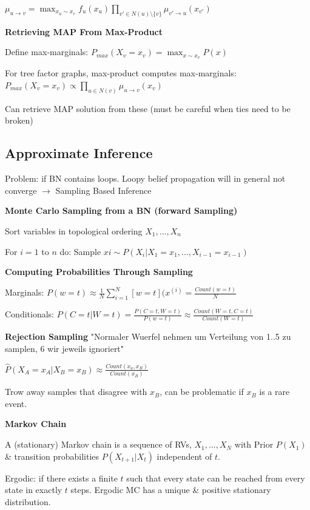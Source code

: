 \documentclass[a4paper, 11pt]{scrartcl}
\begin{document}
\begin{multicols*}{3}
$\mu_{u \rightarrow v} = \max_{x_u \sim x_v} f_u(x_u) \prod_{v' \in N(u) \setminus \{v\}} \mu_{v' \rightarrow u}(x_{v'})$ 
 
 \textbf{Retrieving MAP From Max-Product}
 \begin{compactitem}
 \item Define max-marginals: $P_{max}(X_v =x_v) = \max_{x \sim x_v} P(x)$
 \item For tree factor graphs, max-product computes max-marginals: 
 $P_{max}(X_v = x_v) \propto \prod_{u \in N(v)} \mu_{u \rightarrow v} (x_v)$ 
\item Can retrieve MAP solution from these (must be careful when ties need to be broken)
\end{compactitem}
\subsection{Approximate Inference}
Problem: if BN contains loops.
Loopy belief propagation will in general not converge	$\rightarrow$ Sampling Based Inference

\textbf{Monte Carlo Sampling from a BN (forward Sampling)}
\begin{compactitem}
	\item Sort variables in topological ordering $X_1,...,X_n$
	\item For $i=1$ to 	$n$ do: Sample $xi \sim P(X_i | X_1=x_1, ..., X_{i-1}=x_{i-1})$
\end{compactitem}

\textbf{Computing Probabilities Through Sampling}

Marginals: $P(w=t) \approx \frac{1}{N} \sum_{i=1}^{N}[w=t](x^{(i)} =\frac{ Count(w=t)}{N}$

Conditionals: $P(C=t | W=t) = \frac{P(C=t, W=t)}{P(w=t)} \approx \frac{Count(W=t, C=t)}{Count(W=t)}$

\textbf{Rejection Sampling}
"Normaler Wuerfel nehmen um Verteilung von 1..5 zu samplen, 6 wir jeweils ignoriert"

$\hat{P}(X_A = x_A | X_B = x_B) \approx \frac{Count(x_a, x_B)}{Count(x_B)}$

Trow away samples that disagree with $x_B$, can be problematic if $x_B$ is a rare event. 

\textbf{Markov Chain}

A (stationary) Markov chain is a sequence of RVs, $X_1,...,X_N$ with Prior $P(X_1)$ \& transition probabilities $P(X_{t+1} | X_t)$ independent of $t$.


Ergodic: if there exists a finite $t$ such that every state can be reached from every state in exactly $t$ steps. Ergodic MC has a unique \& positive stationary distribution.


\end{multicols*}
\end{document}
